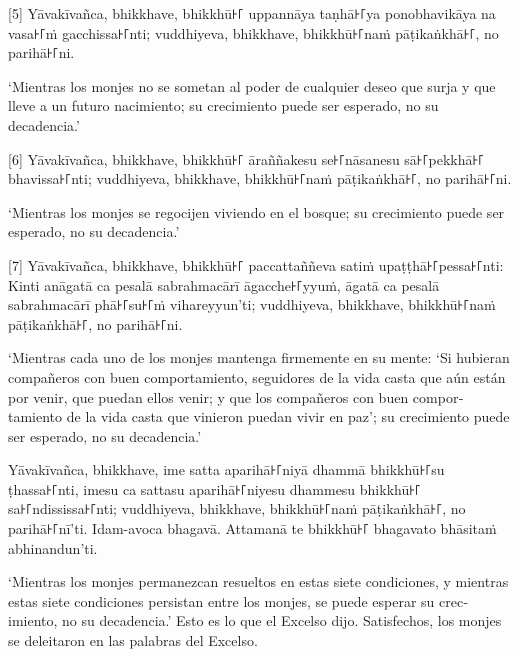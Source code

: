 \enlargethispage{2\baselineskip}

[5] Yāvakīvañca, bhikkhave, bhikkhū꜔꜒ uppannāya taṇhā꜔꜒ya ponobhavikāya na vasa꜔꜒ṁ
gacchissa꜔꜒nti; vuddhiyeva, bhikkhave, bhikkhū꜔꜒naṁ pāṭikaṅkhā꜔꜒, no parihā꜔꜒ni.

\begin{english}
  ‘Mientras los monjes no se sometan al poder de cualquier deseo que surja y
  que lleve a un futuro nacimiento; su crecimiento puede ser
  esperado, no su decadencia.’
\end{english}

[6] Yāvakīvañca, bhikkhave, bhikkhū꜔꜒ āraññakesu se꜔꜒nāsanesu sā꜔꜒pekkhā꜔꜒ bhavissa꜔꜒nti;
vuddhiyeva, bhikkhave, bhikkhū꜔꜒naṁ pāṭikaṅkhā꜔꜒, no parihā꜔꜒ni.

\begin{english}
  ‘Mientras los monjes se regocijen viviendo en el bosque;
  su crecimiento puede ser esperado, no su decadencia.’
\end{english}

[7] Yāvakīvañca, bhikkhave, bhikkhū꜔꜒ paccattaññeva satiṁ upaṭṭhā꜔꜒pessa꜔꜒nti: Kinti
anāgatā ca pesalā sabrahmacārī āgacche꜔꜒yyuṁ, āgatā ca pesalā sabrahmacārī phā꜔꜒su꜔꜒ṁ
vihareyyun'ti; vuddhiyeva, bhikkhave, bhikkhū꜔꜒naṁ pāṭikaṅkhā꜔꜒, no parihā꜔꜒ni.

\begin{english}
  ‘Mientras cada uno de los monjes mantenga firmemente en su mente: ‘Si hubieran
  compañeros con buen comportamiento, seguidores de la vida casta que aún están por
  venir, que puedan ellos venir; y que los compañeros con buen comportamiento de la vida casta
  que vinieron puedan vivir en paz’; su crecimiento puede ser esperado, no su decadencia.’
\end{english}

Yāvakīvañca, bhikkhave, ime satta aparihā꜔꜒niyā dhammā bhikkhū꜔꜒su ṭhassa꜔꜒nti, imesu
ca sattasu aparihā꜔꜒niyesu dhammesu bhikkhū꜔꜒ sa꜔꜒ndississa꜔꜒nti; vuddhiyeva, bhikkhave,
bhikkhū꜔꜒naṁ pāṭikaṅkhā꜔꜒, no parihā꜔꜒nī'ti. Idam-avoca bhagavā. Attamanā te bhikkhū꜔꜒
bhagavato bhāsitaṁ abhinandun'ti.

\begin{english}
  ‘Mientras los monjes permanezcan resueltos en estas siete condiciones, y mientras
  estas siete condiciones persistan entre los monjes, se puede esperar su
  crecimiento, no su decadencia.’ Esto es lo que el Excelso dijo. Satisfechos,
  los monjes se deleitaron en las palabras del Excelso.
\end{english}
